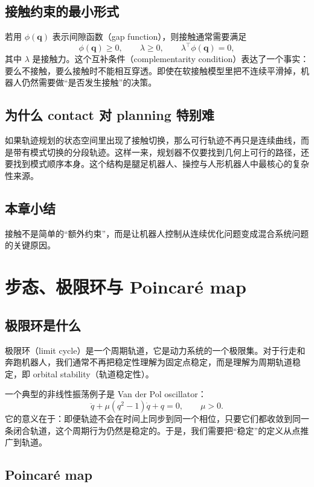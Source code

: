 \documentclass[a4paper]{article}
\newcommand{\bq}{\mathbf{q}}
\begin{document}
\subsection{接触约束的最小形式}

若用 $\phi(\bq)$ 表示间隙函数（gap function），则接触通常需要满足
\[
\phi(\bq)\ge 0,\qquad \lambda \ge 0,\qquad \lambda^\top \phi(\bq)=0,
\]
其中 $\lambda$ 是接触力。这个互补条件（complementarity condition）表达了一个事实：要么不接触，要么接触时不能相互穿透。即使在软接触模型里把不连续平滑掉，机器人仍然需要做“是否发生接触”的决策。

\subsection{为什么 contact 对 planning 特别难}

如果轨迹规划的状态空间里出现了接触切换，那么可行轨迹不再只是连续曲线，而是带有模式切换的分段轨迹。这样一来，规划器不仅要找到几何上可行的路径，还要找到模式顺序本身。这个结构是腿足机器人、操控与人形机器人中最核心的复杂性来源。

\subsection{本章小结}

接触不是简单的“额外约束”，而是让机器人控制从连续优化问题变成混合系统问题的关键原因。

\section{步态、极限环与 Poincar\'e map}

\subsection{极限环是什么}

极限环（limit cycle）是一个周期轨道，它是动力系统的一个极限集。对于行走和奔跑机器人，我们通常不再把稳定性理解为固定点稳定，而是理解为周期轨道稳定，即 orbital stability（轨道稳定性）。

一个典型的非线性振荡例子是 Van der Pol oscillator：
\[
\ddot{q} + \mu(q^2-1)\dot{q} + q = 0,\qquad \mu>0.
\]
它的意义在于：即便轨迹不会在时间上同步到同一个相位，只要它们都收敛到同一条闭合轨道，这个周期行为仍然是稳定的。于是，我们需要把“稳定”的定义从点推广到轨道。

\subsection{Poincar\'e map}
\end{document}
